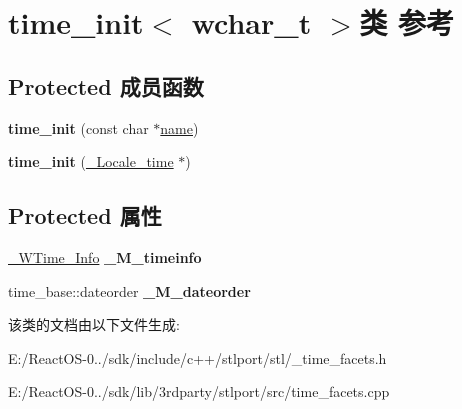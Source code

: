 \hypertarget{classtime__init_3_01wchar__t_01_4}{}\section{time\+\_\+init$<$ wchar\+\_\+t $>$类 参考}
\label{classtime__init_3_01wchar__t_01_4}
\subsection*{Protected 成员函数}
\begin{DoxyCompactItemize}
\item 
\mbox{\label{classtime__init_3_01wchar__t_01_4_adb7842c01fac98e3151b10d95ead0f4e}} 
{\bfseries time\+\_\+init} (const char $\ast$\hyperlink{structname}{name})
\item 
\mbox{\label{classtime__init_3_01wchar__t_01_4_a4818a964cb7e2068ba6b9a6da673662d}} 
{\bfseries time\+\_\+init} (\hyperlink{struct___locale__time}{\+\_\+\+Locale\+\_\+time} $\ast$)
\end{DoxyCompactItemize}
\subsection*{Protected 属性}
\begin{DoxyCompactItemize}
\item 
\mbox{\label{classtime__init_3_01wchar__t_01_4_ad2474fe4f8e7ecc6b975f1a0e460ae78}} 
\hyperlink{class___w_time___info}{\+\_\+\+W\+Time\+\_\+\+Info} {\bfseries \+\_\+\+M\+\_\+timeinfo}
\item 
\mbox{\label{classtime__init_3_01wchar__t_01_4_a1ada42837f6e6715df71866882cc32ab}} 
time\+\_\+base\+::dateorder {\bfseries \+\_\+\+M\+\_\+dateorder}
\end{DoxyCompactItemize}


该类的文档由以下文件生成\+:\begin{DoxyCompactItemize}
\item 
E\+:/\+React\+O\+S-\/0../sdk/include/c++/stlport/stl/\+\_\+time\+\_\+facets.\+h\item 
E\+:/\+React\+O\+S-\/0../sdk/lib/3rdparty/stlport/src/time\+\_\+facets.\+cpp\end{DoxyCompactItemize}
